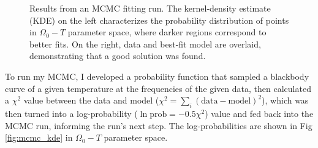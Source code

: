 \documentclass[12pt]{article}
\newenvironment{answer}[2][Answer]{\begin{trivlist}
\item[\hskip \labelsep {\bfseries #1}\hskip \labelsep {\bfseries #2.}]}{\end{trivlist}}
\begin{document}
\begin{answer}{2}
  \begin{figure}[htp]
    \hspace*{\fill}%
    \hfill%
    \hfill%
    \hspace*{\fill}%
    \caption{Results from an MCMC fitting run. The kernel-density estimate (KDE) on the left characterizes the probability distribution of points in $\Omega_0-T$ parameter space, where darker regions correspond to better fits. On the right, data and best-fit model are overlaid, demonstrating that a good solution was found.}
  \end{figure}


  To run my MCMC, I developed a probability function that sampled a blackbody curve of a given temperature at the frequencies of the given data, then calculated a $\chi^2$ value between the data and model ($\chi^2 = \sum_i (\text{data} - \text{model})^2$), which was then turned into a log-probability ($\ln \text{prob} = -0.5 \chi^2$) value and fed back into the MCMC run, informing the run's next step. The log-probabilities are shown in Fig \ref{fig:mcmc_kde} in $\Omega_0-T$ parameter space.


\end{answer}
\end{document}
